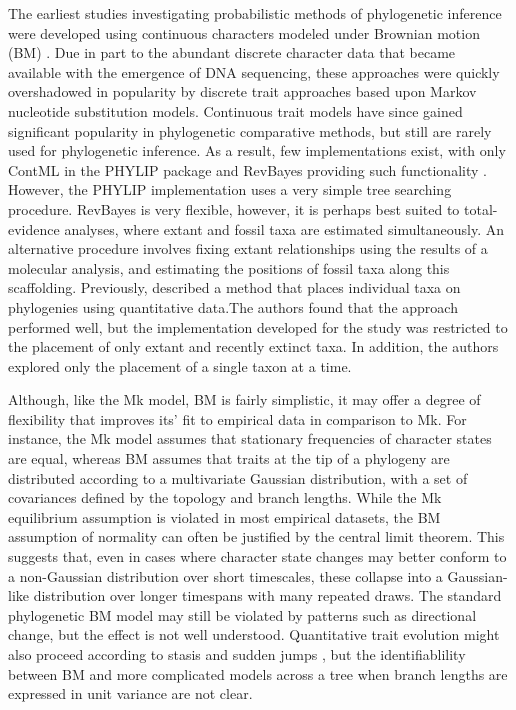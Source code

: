 \documentclass[12pt]{article}
\begin{document}
The earliest studies investigating probabilistic methods of phylogenetic
inference were developed using continuous characters modeled under
Brownian motion (BM) \citep{cavalli1967,felsenstein1973}. Due in part to the abundant discrete character data that became
available with the emergence of DNA sequencing, these approaches were
quickly overshadowed in popularity by discrete trait approaches based
upon Markov nucleotide substitution models. Continuous trait models have
since gained significant popularity in phylogenetic comparative methods,
but still are rarely used for phylogenetic inference. As a result, few
implementations exist, with only ContML in the PHYLIP package and
RevBayes providing such functionality \citep{hohna2016revbayes}. However, the PHYLIP implementation uses a very simple tree searching procedure. RevBayes is very flexible, however, it is perhaps best suited to total-evidence analyses, where extant and fossil taxa are estimated simultaneously.  An alternative procedure involves fixing extant relationships using the results of a molecular analysis, and estimating the positions of fossil taxa along this scaffolding. Previously, \cite{revell2015placing} described a method that places individual taxa on phylogenies using quantitative data.The authors found that the approach performed well, but the implementation developed for the study was restricted to the placement of only extant and recently extinct taxa. In addition, the authors explored only the placement of a single taxon at a time.

Although, like the Mk model, BM is fairly simplistic, it may offer a degree of flexibility that improves its' fit to empirical data in comparison to Mk. For instance, the Mk model assumes that stationary frequencies of character states are equal, whereas BM assumes that traits at the tip of a phylogeny are distributed according to a multivariate Gaussian distribution, with a set of covariances defined by the topology and branch lengths. While the Mk equilibrium assumption is violated in most empirical datasets, the BM assumption of normality can often be justified by the central limit theorem. This suggests that, even in cases where character state changes may better conform to a non-Gaussian distribution over short timescales, these collapse into a Gaussian-like distribution over longer timespans with many repeated draws. The standard phylogenetic BM model may still be violated by patterns such as directional change, but the effect is not well understood. Quantitative trait evolution might also proceed according to stasis and sudden jumps \citep{landis2013phylogenetic}, but the identifiablility between BM and more complicated models across a tree when branch lengths are expressed in unit variance are not clear. 
\end{document}
